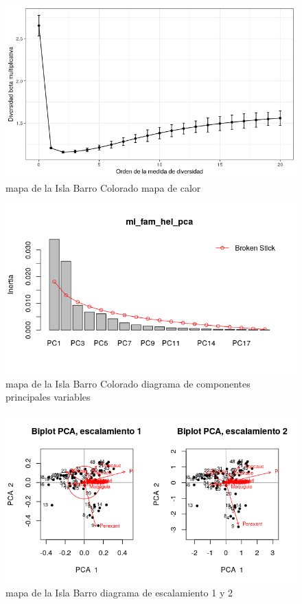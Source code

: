 \documentclass[11pt,]{article}
\begin{document}
\begin{figure}
\centering
\includegraphics[width=1.00000\textwidth]{diversidad_beta.png}
\caption{mapa de la Isla Barro Colorado mapa de calor
\label{fig:bci_map}}
\end{figure}

\begin{figure}
\centering
\includegraphics[width=1.00000\textwidth]{mi_fam_hel_pca.png}
\caption{mapa de la Isla Barro Colorado diagrama de componentes
principales variables\label{fig:bci_map}}
\end{figure}

\begin{figure}
\centering
\includegraphics[width=1.00000\textwidth]{escalamiento_1_2.png}
\caption{mapa de la Isla Barro diagrama de escalamiento 1 y 2
\label{fig:bci_map}}
\end{figure}
\end{document}
